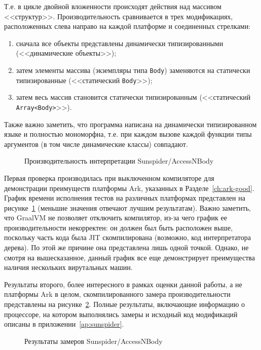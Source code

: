 \documentclass[times
]{itmo-student-thesis}
\begin{document}
Т.е. в цикле двойной вложенности происходят действия над массивом <<структур>>. Производительность сравнивается в трех модификациях, расположенных слева направо на каждой платформе и соединенных стрелками:
\begin{enumerate}
	\item сначала все объекты представлены динамически типизированными (<<динамические объекты>>);
	\item затем элементы массива (экземпляры типа \texttt{Body}) заменяются на статически типизированные (<<статический \texttt{Body}>>);
	\item затем весь массив становится статически типизированным (<<статический \texttt{Array<Body>}>>).
\end{enumerate}

Также важно заметить, что программа написана на динамически типизированном языке и полностью мономорфна, т.е. при каждом вызове каждой функции типы аргументов (в том числе динамические классы) совпадают.

\begin{figure}[!h]
	\caption{Производительность интерпретации Sunspider/AccessNBody}\label{fig:accessnbodyinterpres}
	\resizebox{\textwidth}{!}{}
\end{figure}

Первая проверка производилась при выключенном компиляторе для демонстрации преимуществ платформы Ark, указанных в Разделе~\ref{ch:ark-good}. График времени исполнения тестов на различных платформах представлен на рисунке~\ref{fig:accessnbodyinterpres} (меньшие значения отвечают лучшим результатам). Важно заметить, что GraalVM не позволяет отключить компилятор, из-за чего график ее производительности некорректен: он должен был быть расположен выше, поскольку часть кода была JIT скомпилирована (возможно, код интерпретатора дерева). По этой же причине она представлена лишь одной точкой. Однако, не смотря на вышесказанное, данный график все еще демонстрирует преимущества наличия нескольких вирутальных машин.

Результаты второго, более интересного в рамках оценки данной работы, а не платформы Ark в целом, скомпилированного замера производительности представлены на рисунке~\ref{fig:accessnbodyres}. Полные результаты, включающие информацию о процессоре, на котором выполнялись замеры и исходный код модификаций описаны в приложении~\ref{ap:sunspider}.
\begin{figure}[!h]
	\caption{Результаты замеров Sunspider/AccessNBody}\label{fig:accessnbodyres}
	\resizebox{\textwidth}{!}{}
\end{figure}
\end{document}
